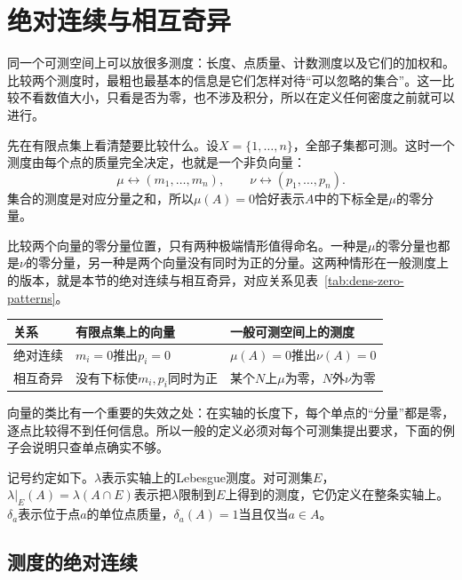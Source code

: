 \section{绝对连续与相互奇异}
\label{sec:dens-ac-singular}

同一个可测空间上可以放很多测度：长度、点质量、计数测度以及它们的加权和。比较两个测度时，最粗也最基本的信息是它们怎样对待“可以忽略的集合”。这一比较不看数值大小，只看是否为零，也不涉及积分，所以在定义任何密度之前就可以进行。

先在有限点集上看清楚要比较什么。设$X=\{1,\ldots,n\}$，全部子集都可测。这时一个测度由每个点的质量完全决定，也就是一个非负向量：
\[
\mu\longleftrightarrow(m_1,\ldots,m_n),\qquad\nu\longleftrightarrow(p_1,\ldots,p_n).
\]
集合的测度是对应分量之和，所以$\mu(A)=0$恰好表示$A$中的下标全是$\mu$的零分量。

比较两个向量的零分量位置，只有两种极端情形值得命名。一种是$\mu$的零分量也都是$\nu$的零分量，另一种是两个向量没有同时为正的分量。这两种情形在一般测度上的版本，就是本节的绝对连续与相互奇异，对应关系见表~\ref{tab:dens-zero-patterns}。

\begin{BookInlineTable}
\small
\begin{tabular}{@{}>{\RaggedRight\arraybackslash}p{18mm}>{\RaggedRight\arraybackslash}p{\dimexpr(\linewidth-18mm-4\tabcolsep)/2\relax}>{\RaggedRight\arraybackslash}p{\dimexpr(\linewidth-18mm-4\tabcolsep)/2\relax}@{}}
\toprule
关系 & 有限点集上的向量 & 一般可测空间上的测度\\
\midrule
绝对连续 & $m_i=0$推出$p_i=0$ & $\mu(A)=0$推出$\nu(A)=0$\\
相互奇异 & 没有下标使$m_i,p_i$同时为正 & 某个$N$上$\mu$为零，$N$外$\nu$为零\\
\bottomrule
\end{tabular}
\caption{两种测度关系与非负向量零分量模式的对应。}
\label{tab:dens-zero-patterns}
\end{BookInlineTable}

向量的类比有一个重要的失效之处：在实轴的长度下，每个单点的“分量”都是零，逐点比较得不到任何信息。所以一般的定义必须对每个可测集提出要求，下面的例子会说明只查单点确实不够。

记号约定如下。$\lambda$表示实轴上的Lebesgue测度。对可测集$E$，$\lambda|_E(A)=\lambda(A\cap E)$表示把$\lambda$限制到$E$上得到的测度，它仍定义在整条实轴上。$\delta_a$表示位于点$a$的单位点质量，$\delta_a(A)=1$当且仅当$a\in A$。

\subsection{测度的绝对连续}
\label{sec:dens-absolute-continuity}

